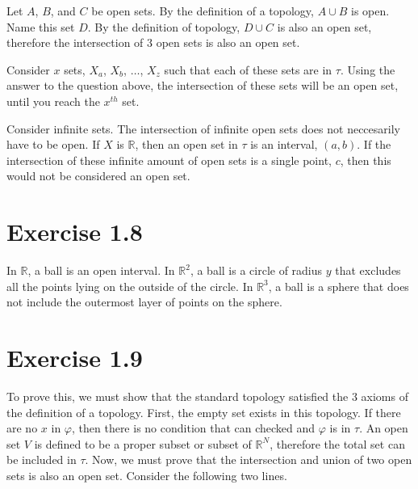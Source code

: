 \documentclass{report}
\begin{document}
\sol Let $A$, $B$, and $C$ be open sets. By the definition of a topology, $A \cup B$ is open. Name this set $D$. By the definition of topology, $D \cup C$ is also an open set, therefore the intersection of $3$ open sets is also an open set. 

\sol Consider $x$ sets, $X_a$, $X_b$, $\dots$, $X_z$ such that each of these sets are in $\tau$. Using the answer to the question above, the intersection of these sets will be an open set, until you reach the $x^{th}$ set. 

\sol Consider infinite sets. The intersection of infinite open sets does not neccesarily have to be open. If $X$ is $\mathbb{R}$, then an open set in $\tau$ is an interval, $(a, b)$. If the intersection of these infinite amount of open sets is a single point, ${c}$, then this would not be considered an open set. 

\section{Exercise 1.8}
\sol In $\mathbb{R}$, a ball is an open interval. In $\mathbb{R}^2$, a ball is a circle of radius $y$ that excludes all the points lying on the outside of the circle. In $\mathbb{R}^3$, a ball is a sphere that does not include the outermost layer of points on the sphere. 

\section{Exercise 1.9}


\sol To prove this, we must show that the standard topology satisfied the $3$ axioms of the definition of a topology. First, the empty set exists in this topology. If there are no $x$ in $\varphi$, then there is no condition that can checked and $\varphi$ is in $\tau$. An open set $V$ is defined to be a proper subset or subset of $\mathbb{R}^N$, therefore the total set can be included in $\tau$. Now, we must prove that the intersection and union of two open sets is also an open set. Consider the following two lines. 
\end{document}
